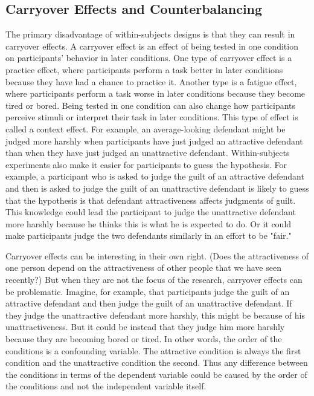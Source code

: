 \subsection{Carryover Effects and Counterbalancing}

The primary disadvantage of within-subjects designs is that they can result in carryover effects. A carryover effect is an effect of being tested in one condition on participants' behavior in later conditions. One type of carryover effect is a practice effect, where participants perform a task better in later conditions because they have had a chance to practice it. Another type is a fatigue effect, where participants perform a task worse in later conditions because they become tired or bored. Being tested in one condition can also change how participants perceive stimuli or interpret their task in later conditions. This type of effect is called a context effect. For example, an average-looking defendant might be judged more harshly when participants have just judged an attractive defendant than when they have just judged an unattractive defendant. Within-subjects experiments also make it easier for participants to guess the hypothesis. For example, a participant who is asked to judge the guilt of an attractive defendant and then is asked to judge the guilt of an unattractive defendant is likely to guess that the hypothesis is that defendant attractiveness affects judgments of guilt. This knowledge could lead the participant to judge the unattractive defendant more harshly because he thinks this is what he is expected to do. Or it could make participants judge the two defendants similarly in an effort to be "fair."

Carryover effects can be interesting in their own right. (Does the attractiveness of one person depend on the attractiveness of other people that we have seen recently?) But when they are not the focus of the research, carryover effects can be problematic. Imagine, for example, that participants judge the guilt of an attractive defendant and then judge the guilt of an unattractive defendant. If they judge the unattractive defendant more harshly, this might be because of his unattractiveness. But it could be instead that they judge him more harshly because they are becoming bored or tired. In other words, the order of the conditions is a confounding variable. The attractive condition is always the first condition and the unattractive condition the second. Thus any difference between the conditions in
terms of the dependent variable could be caused by the order of the conditions and not the independent variable itself.

